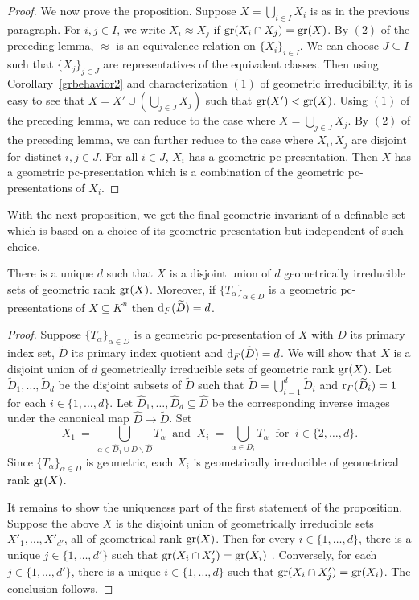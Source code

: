 \begin{proof}
We now prove the proposition. Suppose $X = \bigcup_{i\in I} X_i$ is as in the previous paragraph. For $i, j \in I$, we write $X_i \approx X_j$ if $\mathrm{gr}(X_i \cap X_j) =\mathrm{gr}(X)$. By $(2)$ of the preceding lemma, $\approx$ is an equivalence relation on $\{X_i\}_{i \in I}$. We can choose $J \subseteq I$ such that $\{X_j\}_{j \in J}$ are representatives of the equivalent classes. Then using Corollary~\ref{grbehavior2} and characterization $(1)$ of geometric irreducibility, it is easy to see that $X =X' \cup \left( \bigcup_{j \in J} X_j\right)$ such that $\mathrm{gr}(X')<\mathrm{gr}(X)$. Using $(1)$ of the preceding lemma, we can reduce to the case where $X =\bigcup_{j \in J} X_j$. By $(2)$ of the preceding lemma, we can further reduce to the case where $X_i, X_j$ are disjoint for distinct $i, j \in J$. For all $i \in J$, $X_i$ has a geometric pc-presentation.  Then $X$ has a geometric  pc-presentation which is a combination of the geometric pc-presentations of $X_i$.
\end{proof}

\noindent With the next proposition, we get the final geometric invariant of a definable set which is based on a choice of its geometric presentation but independent of such choice.

\begin{prop}
There is a unique $d$ such that $X$ is a disjoint union of $d$ geometrically irreducible sets of geometric rank $\mathrm{gr}(X)$. Moreover, if $\{ T_\alpha\}_{ \alpha \in D}$ is a geometric pc-presentations of $X \subseteq K^n$ then $\mathrm{d}_F(\widetilde{D})=d$.
\end{prop}
\begin{proof}
Suppose $\{ T_\alpha\}_{ \alpha \in D}$ is a geometric pc-presentation of $X$ with $\hat{D}$ its primary index set, $\widetilde{D}$ its primary index quotient and $\mathrm{d}_F(\widetilde{D})=d$. We will show that $X$  is a disjoint union of $d$ geometrically irreducible sets of geometric rank $\mathrm{gr}(X)$.
Let $\widetilde{D}_1, \ldots, \widetilde{D}_d$ be the disjoint subsets of $\widetilde{D}$ such that $\widetilde{D} = \bigcup_{i=1}^d \widetilde{D}_i$ and  $\mathrm{r}_F(\widetilde{D}_i)=1$  for each $i \in \{1, \ldots,d\}$. Let $\hat{D}_1, \ldots, \hat{D}_d \subseteq \hat{D}$ be the corresponding inverse images under the canonical map $\hat{D} \to \widetilde{D}$.
Set $$X_1\ =\ \bigcup_{\alpha \in \hat{D}_1 \cup D\backslash \hat{D}} T_\alpha\ \text{ and }\ X_i\ =\ \bigcup_{\alpha \in D_i} T_\alpha \  \text{ for }\ i \in \{2, \ldots, d \}.$$ Since $\{ T_\alpha\}_{ \alpha \in D}$ is geometric, each $X_i$ is geometrically irreducible of geometrical rank $\mathrm{gr}(X)$.

It remains to show the uniqueness part of the first statement of the proposition. Suppose the above $X$ is the disjoint union of geometrically irreducible sets $X'_1, \ldots, X'_{d'}$, all of geometrical rank $\mathrm{gr}(X)$. Then for every $i \in \{1, \ldots, d\}$, there is a unique $j \in \{1, \ldots, d'\}$ such that $\mathrm{gr}(X_i \cap X'_{j}) = \mathrm{gr}(X_i)$ . Conversely, for each $j \in \{1, \ldots, d'\} $, there is a unique $i \in \{1, \ldots, d\}$ such that $\mathrm{gr}(X_i \cap X'_{j}) = \mathrm{gr}(X_i) $. The conclusion follows.
\end{proof}

